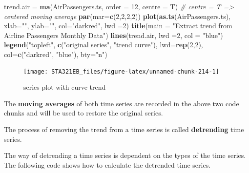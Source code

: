 \documentclass[
]{book}
\newenvironment{Shaded}{\begin{snugshade}}{\end{snugshade}}
\newcommand{\AttributeTok}[1]{\textcolor[rgb]{0.13,0.29,0.53}{#1}}
\newcommand{\CommentTok}[1]{\textcolor[rgb]{0.56,0.35,0.01}{\textit{#1}}}
\newcommand{\DecValTok}[1]{\textcolor[rgb]{0.00,0.00,0.81}{#1}}
\newcommand{\FunctionTok}[1]{\textcolor[rgb]{0.13,0.29,0.53}{\textbf{#1}}}
\newcommand{\NormalTok}[1]{#1}
\newcommand{\OtherTok}[1]{\textcolor[rgb]{0.56,0.35,0.01}{#1}}
\newcommand{\StringTok}[1]{\textcolor[rgb]{0.31,0.60,0.02}{#1}}
\begin{document}
\begin{Shaded}
\begin{Highlighting}[]
\NormalTok{trend.air }\OtherTok{=} \FunctionTok{ma}\NormalTok{(AirPassengers.ts, }\AttributeTok{order =} \DecValTok{12}\NormalTok{, }\AttributeTok{centre =}\NormalTok{ T)  }\CommentTok{\# centre = T =\textgreater{} centered moving average}
\FunctionTok{par}\NormalTok{(}\AttributeTok{mar=}\FunctionTok{c}\NormalTok{(}\DecValTok{2}\NormalTok{,}\DecValTok{2}\NormalTok{,}\DecValTok{2}\NormalTok{,}\DecValTok{2}\NormalTok{))}
\FunctionTok{plot}\NormalTok{(}\FunctionTok{as.ts}\NormalTok{(AirPassengers.ts), }\AttributeTok{xlab=}\StringTok{""}\NormalTok{, }\AttributeTok{ylab=}\StringTok{""}\NormalTok{, }\AttributeTok{col=}\StringTok{"darkred"}\NormalTok{, }\AttributeTok{lwd =}\DecValTok{2}\NormalTok{)}
\FunctionTok{title}\NormalTok{(}\AttributeTok{main =} \StringTok{"Extract trend from Airline Passengers Monthly Data"}\NormalTok{)}
\FunctionTok{lines}\NormalTok{(trend.air, }\AttributeTok{lwd =}\DecValTok{2}\NormalTok{, }\AttributeTok{col =} \StringTok{"blue"}\NormalTok{)}
\FunctionTok{legend}\NormalTok{(}\StringTok{"topleft"}\NormalTok{, }\FunctionTok{c}\NormalTok{(}\StringTok{"original series"}\NormalTok{, }\StringTok{"trend curve"}\NormalTok{), }\AttributeTok{lwd=}\FunctionTok{rep}\NormalTok{(}\DecValTok{2}\NormalTok{,}\DecValTok{2}\NormalTok{),}
       \AttributeTok{col=}\FunctionTok{c}\NormalTok{(}\StringTok{"darkred"}\NormalTok{, }\StringTok{"blue"}\NormalTok{), }\AttributeTok{bty=}\StringTok{"n"}\NormalTok{)}
\end{Highlighting}
\end{Shaded}

\begin{figure}

{\centering \texttt{[image: STA321EB\_files/figure-latex/unnamed-chunk-214-1]} 

}

\caption{series plot with curve trend}\label{fig:unnamed-chunk-214}
\end{figure}

The \textbf{moving averages} of both time series are recorded in the above two code chunks and will be used to restore the original series.

The process of removing the trend from a time series is called \textbf{detrending} time series.

The way of detrending a time series is dependent on the types of the time series. The following code shows how to calculate the detrended time series.
\end{document}
